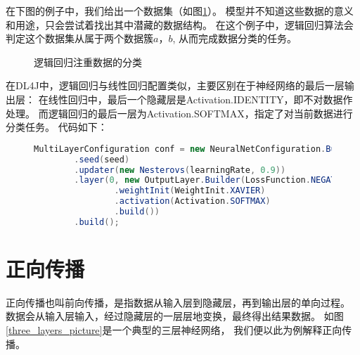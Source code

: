 在下图的例子中，我们给出一个数据集（如图\ref{Logic_picture}）。
模型并不知道这些数据的意义和用途，只会尝试着找出其中潜藏的数据结构。
在这个例子中，逻辑回归算法会判定这个数据集从属于两个数据簇$a$，$b$,
从而完成数据分类的任务。
\vspace{5pt}

    \begin{figure}[!hb]
    \begin{center}
    \caption{逻辑回归注重数据的分类}
    \label{Logic_picture}
    \end{center}
    \end{figure}


在DL4J中，逻辑回归与线性回归配置类似，主要区别在于神经网络的最后一层输出层：
在线性回归中，最后一个隐藏层是Activation.IDENTITY，即不对数据作处理。
而逻辑回归的最后一层为Activation.SOFTMAX，指定了对当前数据进行分类任务。
代码如下：

\begin{figure}[!hb]
\begin{lstlisting}[language=Java]
        MultiLayerConfiguration conf = new NeuralNetConfiguration.Builder()
        .seed(seed)
        .updater(new Nesterovs(learningRate, 0.9))
        .layer(0, new OutputLayer.Builder(LossFunction.NEGATIVELOGLIKELIHOOD)
                .weightInit(WeightInit.XAVIER)
                .activation(Activation.SOFTMAX)
                .build())
        .build();
\end{lstlisting}
\end{figure}


\section{正向传播}
正向传播也叫前向传播，是指数据从输入层到隐藏层，再到输出层的单向过程。
数据会从输入层输入，经过隐藏层的一层层地变换，最终得出结果数据。
如图\ref{three_layers_picture}是一个典型的三层神经网络，
我们便以此为例解释正向传播。

